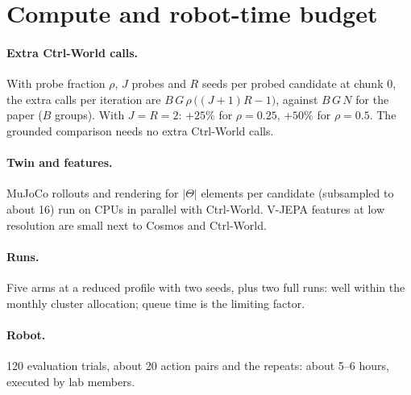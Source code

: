\documentclass[11pt,a4paper]{article}
\theoremstyle{plain}
\theoremstyle{definition}
\theoremstyle{remark}
\begin{document}
\section{Compute and robot-time budget}\label{sec:budget}
\paragraph{Extra Ctrl-World calls.} With probe fraction $\rho$, $J$ probes and $R$ seeds per probed candidate at chunk 0, the extra calls per iteration are $B\,G\,\rho\,\big((J+1)R-1\big)$, against $B\,G\,N$ for the paper ($B$ groups). With $J=R=2$: $+25\%$ for $\rho=0.25$, $+50\%$ for $\rho=0.5$. The grounded comparison needs no extra Ctrl-World calls.
\paragraph{Twin and features.} MuJoCo rollouts and rendering for $|\Theta|$ elements per candidate (subsampled to about 16) run on CPUs in parallel with Ctrl-World. V-JEPA features at low resolution are small next to Cosmos and Ctrl-World.
\paragraph{Runs.} Five arms at a reduced profile with two seeds, plus two full runs: well within the monthly cluster allocation; queue time is the limiting factor.
\paragraph{Robot.} 120 evaluation trials, about 20 action pairs and the repeats: about 5--6 hours, executed by lab members.

\end{document}
